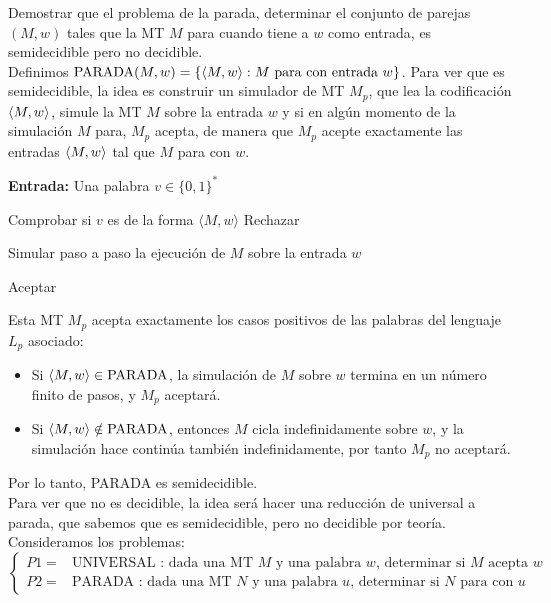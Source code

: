 \begin{ejercicio}
    Demostrar que el problema de la parada, determinar el conjunto de parejas $(M, w)$ tales
    que la MT $M$ para cuando tiene a $w$ como entrada, es semidecidible pero no decidible. \\

    Definimos $\text{PARADA}(M,w) = \{\langle M, w \rangle : M \text{ para con entrada } w\}$. Para ver que es 
    semidecidible, la idea es construir un simulador de MT $M_p$, que lea la codificación
    $\langle M, w \rangle$, simule la MT $M$ sobre la entrada $w$ y si en algún momento de la simulación $M$ para, $M_p$
    acepta, de manera que $M_p$ acepte exactamente las entradas $\langle M, w \rangle$ tal que $M$ para con $w$.

    \begin{algorithm}
        \caption{Máquina de Turing $M_p$}
        \label{algorithm:parada-semidecidible}
        \begin{algorithmic}
            \State \textbf{Entrada:} Una palabra $v \in \{0,1\}^*$

            \State Comprobar si $v$ es de la forma $\langle M,w\rangle$
                \State Rechazar
            \EndIf

            \State Simular paso a paso la ejecución de $M$ sobre la entrada $w$

                \State Aceptar
            \EndIf
        \end{algorithmic}
    \end{algorithm}

    Esta MT $M_p$ acepta exactamente los casos positivos de las palabras del lenguaje $L_p$ asociado:
    \begin{itemize}
        \item Si $\langle M, w \rangle\in \text{PARADA}$, la simulación de $M$ sobre $w$ termina en un número finito de pasos, y 
        $M_p$ aceptará.
        \item Si $\langle M, w \rangle\notin \text{PARADA}$, entonces $M$ cicla indefinidamente sobre $w$, y la simulación hace continúa
        también indefinidamente, por tanto $M_p$ no aceptará.
    \end{itemize}

    Por lo tanto, PARADA es semidecidible. \\

    Para ver que no es decidible, la idea será hacer una reducción de universal a parada, que sabemos que es semidecidible, 
    pero no decidible por teoría. Consideramos los problemas:
    $$\begin{cases}
        P1 = &\text{UNIVERSAL : dada una MT $M$ y una palabra $w$, determinar si $M$ acepta $w$} \\
        P2 = &\text{PARADA : dada una MT $N$ y una palabra $u$, determinar si $N$ para con $u$}
    \end{cases}$$


\end{ejercicio}
